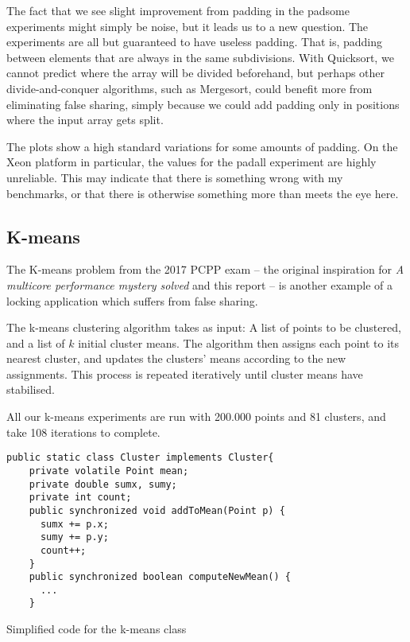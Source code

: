 The fact that we see slight improvement from padding in the padsome experiments
might simply be noise, but it leads us to a new question. The experiments are
all but guaranteed to have useless padding. That is, padding between elements
that are always in the same subdivisions. With Quicksort, we cannot predict
where the array will be divided beforehand, but perhaps other divide-and-conquer
algorithms, such as Mergesort, could benefit more from eliminating false
sharing, simply because we could add padding only in positions where the input
array gets split.

The plots show a high standard variations for some amounts of padding. On the
Xeon platform in particular, the values for the padall experiment are highly
unreliable. This may indicate that there is something wrong with my benchmarks,
or that there is otherwise something more than meets the eye here.

\subsection{K-means}
The K-means problem from the 2017 PCPP exam -- the original inspiration for
\textit{A multicore performance mystery solved}\cite{mystery} and this report --
is another example of a locking application which suffers from false sharing.

The k-means clustering algorithm takes as input: A list of points to be
clustered, and a list of $k$ initial cluster means. The algorithm then
assigns each point to its nearest cluster, and updates the clusters'
means according to the new assignments. This process is repeated iteratively
until cluster means have stabilised.

All our k-means experiments are run with 200.000 points and 81 clusters, and
take 108 iterations to complete.

\begin{code}
\begin{Verbatim}[frame=single]
  public static class Cluster implements Cluster{
    private volatile Point mean;
    private double sumx, sumy;
    private int count;
    public synchronized void addToMean(Point p) {
      sumx += p.x;
      sumy += p.y;
      count++;
    }
    public synchronized boolean computeNewMean() {
      ...
    }
\end{Verbatim}
	\caption{Simplified code for the k-means  class}
	\label{code:cluster}
\end{code}

